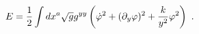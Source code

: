 \begin{equation}
E= {1 \over 2}\int dx^a \sqrt{g} g^{yy} 
\left( \dot{\varphi}^2
+(\partial_y\varphi)^2  + {k\over y^2} \varphi^2 \right)
\ .
\label{energya}
\end{equation}

